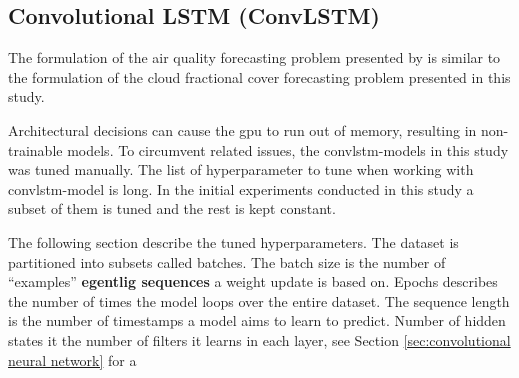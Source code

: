 \begin{table}[hp]
    \centering
    \caption{Update the statistics of the best AR-model. \textbf{Ville det vært interresant?}}
    \label{tab:weights_best_model}
\end{table}

\subsection{Convolutional LSTM (ConvLSTM)}
The formulation of the air quality forecasting problem presented by \citeauthor{SunAirLSTM} is similar to the formulation of the cloud fractional cover forecasting problem presented in this study. 

Architectural decisions %
can cause the \acrshort{gpu} to run out of memory, resulting in non-trainable models.
To circumvent related issues, the \acrshort{convlstm}-models in this study was tuned manually. The list of hyperparameter to tune when working with \acrshort{convlstm}-model is long. In the initial experiments conducted in this study a subset of them is tuned and the rest is kept constant.

The following section describe the tuned hyperparameters. The dataset is partitioned into subsets called batches. The batch size is the number of ``examples'' \textbf{egentlig sequences} a weight update is based on. Epochs describes the number of times the model loops over the entire dataset. The sequence length is the number of timestamps a model aims to learn to predict. Number of hidden states it the number of filters it learns in each layer, see Section \ref{sec:convolutional neural network} for a 

